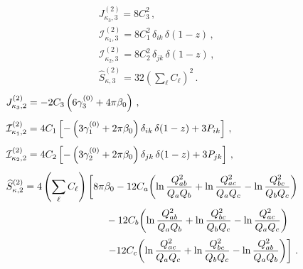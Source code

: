 \begin{subequations}
\label{eq:C23-ingred}
\begin{align}
&J_{\kappa_3,3}^{(2)} = 8C_3^2\,, \\[1ex]
&\mathcal{I}_{\kappa_1,3}^{(2)} = 8C_1^2\,\delta_{ik}\,\delta(1-z)\,, \\[1ex]
&\mathcal{I}_{\kappa_2,3}^{(2)} = 8C_2^2\,\delta_{jk}\,\delta(1-z)\,, \\[1ex]
&\widehat{S}_{\kappa,3}^{(2)} = 32\left(\sum_{\ell}C_{\ell}\right)^2\,.
\end{align}
\end{subequations}
\begin{subequations}
\label{eq:C22-ingred}
\begin{align}
&J_{\kappa_3,2}^{(2)} = -2C_3\left(6\gamma_3^{(0)}+4\pi\beta_0\right)\,, \\[1ex]
&\mathcal{I}_{\kappa_1,2}^{(2)} = 4C_1\left[
    -\left(3\gamma_1^{(0)}+2\pi\beta_0\right)\delta_{ik}\,\delta(1-z)
    +3P_{ik}\right]\,, \\[1ex]
&\mathcal{I}_{\kappa_2,2}^{(2)} = 4C_2\left[
    -\left(3\gamma_2^{(0)}+2\pi\beta_0\right)\delta_{jk}\,\delta(1-z)
    +3P_{jk}\right]\,, \\[1ex]
&\widehat{S}_{\kappa,2}^{(2)} =
    4\left(\sum_{\ell}C_{\ell}\right)\left[8\pi\beta_0-12C_a\!\left(\ln\frac{Q_{ab}^2}{Q_a Q_b}
    +\ln\frac{Q_{ac}^2}{Q_a Q_c}-\ln\frac{Q_{bc}^2}{Q_b Q_c}\right)\right. \notag\\[0.5ex]
  &\qquad\qquad\qquad\qquad\qquad-12C_b\!\left(\ln\frac{Q_{ab}^2}{Q_a Q_b}\notag
      +\ln\frac{Q_{bc}^2}{Q_b Q_c}-\ln\frac{Q_{ac}^2}{Q_a Q_c}\right) \notag\\[0.5ex]
  &\left.\qquad\qquad\qquad\qquad\qquad-12C_c\!\left(\ln\frac{Q_{ac}^2}{Q_a Q_c}
    +\ln\frac{Q_{bc}^2}{Q_b Q_c}-\ln\frac{Q_{ab}^2}{Q_a Q_b}\right)\right]\,.
\end{align}
\end{subequations}

